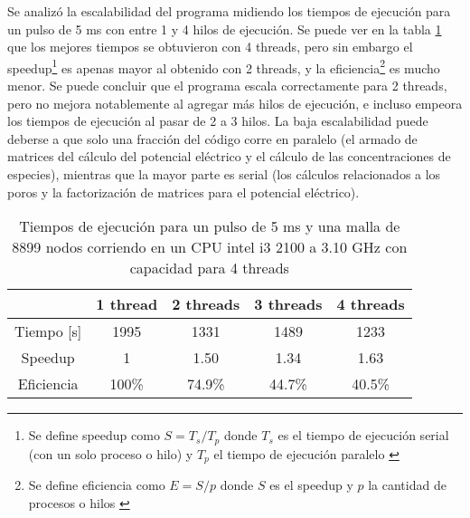 Se analizó la escalabilidad del programa midiendo los tiempos de ejecución para un pulso de 5 \si{\milli\second} con entre 1 y 4 hilos de ejecución. Se puede ver en la tabla \ref{tab:escala} que los mejores tiempos se obtuvieron con 4 threads, pero sin embargo el speedup\footnote{Se define speedup como $S = T_s / T_p$ donde $T_s$ es el tiempo de ejecución serial (con un solo proceso o hilo) y $T_p$ el tiempo de ejecución paralelo \cite{pacheco}} es apenas mayor al obtenido con 2 threads, y la eficiencia\footnote{Se define eficiencia como $E = S / p$ donde $S$ es el speedup y $p$ la cantidad de procesos o hilos \cite{pacheco}} es mucho menor. Se puede concluir que el programa escala correctamente para 2 threads, pero no mejora notablemente al agregar más hilos de ejecución, e incluso empeora los tiempos de ejecución al pasar de 2 a 3 hilos. La baja escalabilidad puede deberse a que solo una fracción del código corre en paralelo (el armado de matrices del cálculo del potencial eléctrico y el cálculo de las concentraciones de especies), mientras que la mayor parte es serial (los cálculos relacionados a los poros y la factorización de matrices para el potencial eléctrico).

\begin{table}[h!]
    \centering
	\begin{tabular}{ c | c c c c }              
		& 1 thread & 2 threads & 3 threads & 4 threads \\
		\hline
		Tiempo [\si{\second}] & 1995 & 1331 & 1489 & 1233 \\
		Speedup & 1 & 1.50 & 1.34 & 1.63 \\
		Eficiencia & 100\% & 74.9\% & 44.7\% & 40.5\% \\
	\end{tabular}
    \caption{Tiempos de ejecución para un pulso de 5 \si{\milli\second} y una malla de 8899 nodos corriendo en un CPU intel i3 2100 a 3.10 GHz con capacidad para 4 threads}
    \label{tab:escala}
\end{table}
